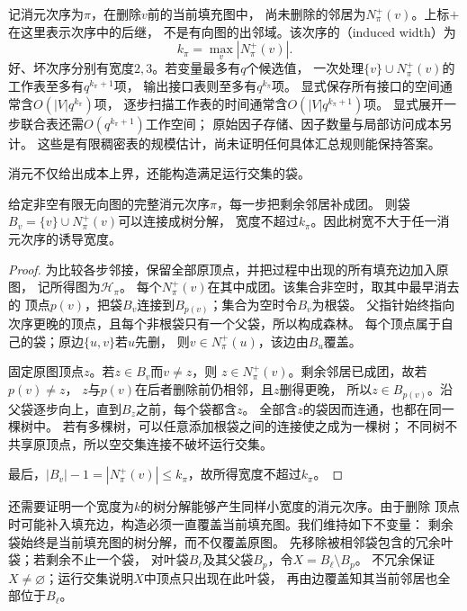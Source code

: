 记消元次序为\(\pi\)，在删除\(v\)前的当前填充图中，
尚未删除的邻居为\(N^+_\pi(v)\)。上标\(+\)在这里表示次序中的后继，
不是有向图的出邻域。该次序的（induced width）为
\[
  k_\pi=\max_v|N^+_\pi(v)|.
\]
好、坏次序分别有宽度\(2,3\)。若变量最多有\(q\)个候选值，
一次处理\(\{v\}\cup N^+_\pi(v)\)的工作表至多有\(q^{k_\pi+1}\)项，
输出接口表则至多有\(q^{k_\pi}\)项。
显式保存所有接口的空间通常含\(O(|V|q^{k_\pi})\)项，
逐步扫描工作表的时间通常含\(O(|V|q^{k_\pi+1})\)项。
显式展开一步联合表还需\(O(q^{k_\pi+1})\)工作空间；
原始因子存储、因子数量与局部访问成本另计。
这些是有限稠密表的规模估计，尚未证明任何具体汇总规则能保持答案。

消元不仅给出成本上界，还能构造满足运行交集的袋。

\begin{theorem}[消元序产生树分解]
  \label{thm:graph-theory-elimination-tree-decomposition}
  给定非空有限无向图的完整消元次序\(\pi\)，每一步把剩余邻居补成团。
  则袋\(B_v=\{v\}\cup N^+_\pi(v)\)可以连接成树分解，
  宽度不超过\(k_\pi\)。因此树宽不大于任一消元次序的诱导宽度。
\end{theorem}

\begin{proof}
为比较各步邻接，保留全部原顶点，并把过程中出现的所有填充边加入原图，
记所得图为\(\mathcal H_\pi\)。
每个\(N^+_\pi(v)\)在其中成团。该集合非空时，取其中最早消去的
顶点\(p(v)\)，把袋\(B_v\)连接到\(B_{p(v)}\)；集合为空时令\(B_v\)为根袋。
父指针始终指向次序更晚的顶点，且每个非根袋只有一个父袋，所以构成森林。
每个顶点属于自己的袋；原边\(\{u,v\}\)若\(u\)先删，
则\(v\in N^+_\pi(u)\)，该边由\(B_u\)覆盖。

固定原图顶点\(z\)。若\(z\in B_v\)而\(v\neq z\)，则
\(z\in N^+_\pi(v)\)。剩余邻居已成团，故若\(p(v)\neq z\)，
\(z\)与\(p(v)\)在后者删除前仍相邻，且\(z\)删得更晚，
所以\(z\in B_{p(v)}\)。沿父袋逐步向上，直到\(B_z\)之前，每个袋都含\(z\)。
全部含\(z\)的袋因而连通，也都在同一棵树中。
若有多棵树，可以任意添加根袋之间的连接使之成为一棵树；
不同树不共享原顶点，所以空交集连接不破坏运行交集。

最后，\(|B_v|-1=|N^+_\pi(v)|\leq k_\pi\)，故所得宽度不超过\(k_\pi\)。
\end{proof}

还需要证明一个宽度为\(k\)的树分解能够产生同样小宽度的消元次序。由于删除
顶点时可能补入填充边，构造必须一直覆盖当前填充图。我们维持如下不变量：
剩余袋始终是当前填充图的树分解，而不仅覆盖原图。
先移除被相邻袋包含的冗余叶袋；若剩余不止一个袋，
对叶袋\(B_\ell\)及其父袋\(B_p\)，令\(X=B_\ell\setminus B_p\)。
不冗余保证\(X\neq\varnothing\)；运行交集说明\(X\)中顶点只出现在此叶袋，
再由边覆盖知其当前邻居也全部位于\(B_\ell\)。

